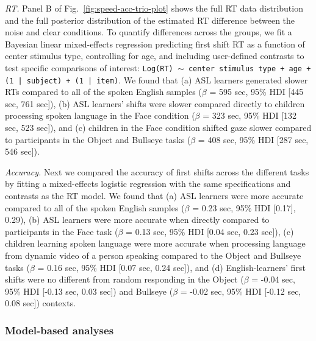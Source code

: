 \documentclass[english,floatsintext,man]{apa6}
\theoremstyle{definition}
\theoremstyle{definition}
\theoremstyle{definition}
\theoremstyle{remark}
\begin{document}
\emph{RT.} Panel B of Fig.~\ref{fig:speed-acc-trio-plot} shows the full
RT data distribution and the full posterior distribution of the
estimated RT difference between the noise and clear conditions. To
quantify differences across the groups, we fit a Bayesian linear
mixed-effects regression predicting first shift RT as a function of
center stimulus type, controlling for age, and including user-defined
contrasts to test specific comparisons of interest:
\texttt{Log(RT) $\sim$ center stimulus type + age +  (1 | subject) + (1 | item)}.
We found that (a) ASL learners generated slower RTs compared to all of
the spoken English samples (\(\beta\) = 595 sec, 95\% HDI {[}445 sec,
761 sec{]}), (b) ASL learners' shifts were slower compared directly to
children processing spoken language in the Face condition (\(\beta\) =
323 sec, 95\% HDI {[}132 sec, 523 sec{]}), and (c) children in the Face
condition shifted gaze slower compared to participants in the Object and
Bullseye tasks (\(\beta\) = 408 sec, 95\% HDI {[}287 sec, 546 sec{]}).

\emph{Accuracy.} Next we compared the accuracy of first shifts across
the different tasks by fitting a mixed-effects logistic regression with
the same specifications and contrasts as the RT model. We found that (a)
ASL learners were more accurate compared to all of the spoken English
samples (\(\beta\) = 0.23 sec, 95\% HDI {[}0.17{]}, 0.29), (b) ASL
learners were more accurate when directly compared to participants in
the Face task (\(\beta\) = 0.13 sec, 95\% HDI {[}0.04 sec, 0.23 sec{]}),
(c) children learning spoken language were more accurate when processing
language from dynamic video of a person speaking compared to the Object
and Bullseye tasks (\(\beta\) = 0.16 sec, 95\% HDI {[}0.07 sec, 0.24
sec{]}), and (d) English-learners' first shifts were no different from
random responding in the Object (\(\beta\) = -0.04 sec, 95\% HDI
{[}-0.13 sec, 0.03 sec{]}) and Bullseye (\(\beta\) = -0.02 sec, 95\% HDI
{[}-0.12 sec, 0.08 sec{]}) contexts.

\hypertarget{model-based-analyses}{%
\subsubsection{Model-based analyses}\label{model-based-analyses}}
\end{document}
